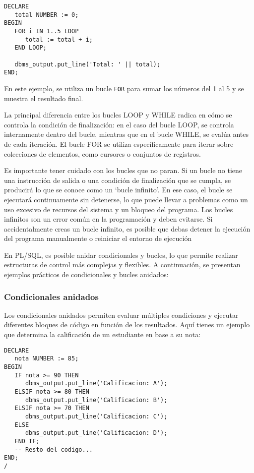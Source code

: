 \documentclass[executivepaper]{article}
\begin{document}
\begin{lstlisting}
DECLARE
   total NUMBER := 0;
BEGIN
   FOR i IN 1..5 LOOP
      total := total + i;
   END LOOP;
   
   dbms_output.put_line('Total: ' || total);
END;
\end{lstlisting}

En este ejemplo, se utiliza un bucle \texttt{FOR} para sumar los números del 1 al 5 y se muestra el resultado final.

La principal diferencia entre los bucles LOOP y WHILE radica en cómo se controla la condición de finalización: en el caso del bucle LOOP, se controla internamente dentro del bucle, mientras que en el bucle WHILE, se evalúa antes de cada iteración. El bucle FOR se utiliza específicamente para iterar sobre colecciones de elementos, como cursores o conjuntos de registros.

Es importante tener cuidado con los bucles que no paran. Si un bucle no tiene una instrucción de salida o una condición de finalización que se cumpla, se producirá lo que se conoce como un \enquote*{bucle infinito}. En ese caso, el bucle se ejecutará continuamente sin detenerse, lo que puede llevar a problemas como un uso excesivo de recursos del sistema y un bloqueo del programa. Los bucles infinitos son un error común en la programación y deben evitarse. Si accidentalmente creas un bucle infinito, es posible que debas detener la ejecución del programa manualmente o reiniciar el entorno de ejecución

En PL/SQL, es posible anidar condicionales y bucles, lo que permite realizar estructuras de control más complejas y flexibles. A continuación, se presentan ejemplos prácticos de condicionales y bucles anidados:

\subsubsection*{Condicionales anidados}

Los condicionales anidados permiten evaluar múltiples condiciones y ejecutar diferentes bloques de código en función de los resultados. Aquí tienes un ejemplo que determina la calificación de un estudiante en base a su nota:

\begin{lstlisting}
DECLARE
   nota NUMBER := 85;
BEGIN
   IF nota >= 90 THEN
      dbms_output.put_line('Calificacion: A');
   ELSIF nota >= 80 THEN
      dbms_output.put_line('Calificacion: B');
   ELSIF nota >= 70 THEN
      dbms_output.put_line('Calificacion: C');
   ELSE
      dbms_output.put_line('Calificacion: D');
   END IF;
   -- Resto del codigo...
END;
/
\end{lstlisting}
\end{document}

